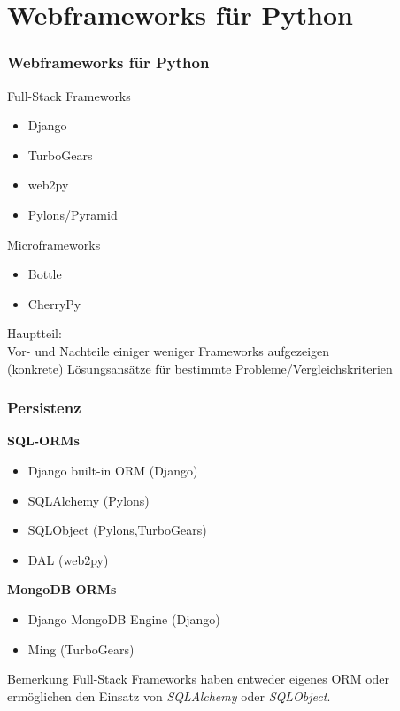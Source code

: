 \documentclass[
    t,
    smaller,
    compress,
]{beamer}
\begin{document}
\section{Webframeworks für Python}
\begin{frame}
  \frametitle{Webframeworks für Python}
  	 Full-Stack Frameworks
  		\begin{itemize}
  			\item Django
  			\item TurboGears 
  			\item web2py
  			\item Pylons/Pyramid
  		\end{itemize}
  		 Microframeworks
  		\begin{itemize}
  			\item Bottle
  			\item CherryPy
  		\end{itemize}
  
\end{frame}


\begin{frame}
Hauptteil:\\
Vor- und Nachteile einiger weniger Frameworks aufgezeigen\\
(konkrete) Lösungsansätze für bestimmte Probleme/Vergleichskriterien
\end{frame}


\begin{frame}
  \frametitle{Persistenz}
 
    \textbf{SQL-ORMs}
    \begin{itemize}[<1->]
        \item Django built-in ORM (Django)
        \item SQLAlchemy (Pylons) %
        \item SQLObject (Pylons,TurboGears)
        \item DAL (web2py)
     \end{itemize}
     \textbf{MongoDB ORMs}
    \begin{itemize}[<1->]
        \item Django MongoDB Engine (Django)
        \item Ming (TurboGears)
    \end{itemize}
 
  \begin{block}{Bemerkung}
     Full-Stack Frameworks haben entweder eigenes ORM 	oder ermöglichen den Einsatz von \textit{SQLAlchemy} oder \textit{SQLObject}.
  \end{block}

\end{frame}
\end{document}
